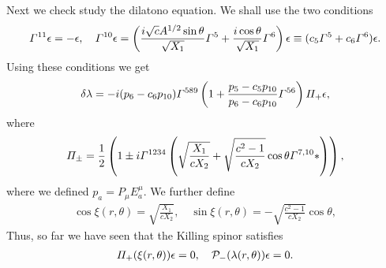 \documentclass[11pt]{article}
\let\oldGamma=\Gamma
\let\oldPi=\Pi
\renewcommand{\Gamma}{\mathnormal{\oldGamma}}
\renewcommand{\Pi}{\mathnormal{\oldPi}}
\begin{document}
Next we check study the dilatono equation.
We shall use the two conditions
\begin{align}
\Gamma^{11}  \epsilon = - \epsilon,\quad
\Gamma^{10}\epsilon = \left(\frac{i \sqrt{c}A^{1/2}\sin\theta}{\sqrt{X_1}}\Gamma^{5} + \frac{i \cos\theta}{\sqrt{X_1}}\Gamma^{6}\right)\epsilon
\equiv  (c_5 \Gamma^5 + c_6 \Gamma^6)\epsilon.
\end{align}
Using these conditions we get
\begin{align}
\delta \lambda = -i(p_6 - c_6 p_{10})\Gamma^{589}\left(1 + \frac{p_5 - c_5 p_{10}}{p_6 - c_6 p_{10}} \Gamma^{56}\right) \Pi_+ \epsilon,
\end{align}
where
\begin{align}
\Pi_\pm = \frac{1}{2}\left(1\pm i\Gamma^{1234}\left(\sqrt{\frac{X_1}{c X_2}} + \sqrt{\frac{c^2 - 1}{c X_2}}\cos\theta\Gamma^{7,10} *\right)\right),
\end{align}
where we defined $p_a = P_\mu E_a^\mu$.
We further define
\begin{align}
\cos\xi(r,\theta) = \sqrt{\frac{X_1}{c X_2}},\quad
\sin\xi(r,\theta) = -\sqrt{\frac{c^2 - 1}{c X_2}}\cos\theta,
\end{align}
Thus, so far we have seen that the Killing spinor satisfies
\begin{align}
\Pi_+(\xi(r,\theta))\epsilon = 0,\quad
\mathcal{P}_-(\lambda(r,\theta))\epsilon = 0.
\end{align}
\end{document}
